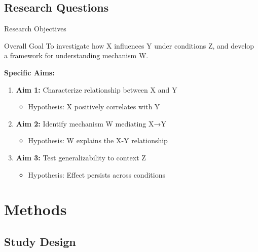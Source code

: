 \documentclass[aspectratio=169,11pt]{beamer}
\begin{document}
\subsection{Research Questions}

\begin{frame}{Research Objectives}
  \begin{exampleblock}{Overall Goal}
    To investigate how X influences Y under conditions Z, and develop a framework for understanding mechanism W.
  \end{exampleblock}

  \vspace{0.5cm}

  \textbf{Specific Aims:}
  \begin{enumerate}
    \item \textbf{Aim 1:} Characterize relationship between X and Y
    \begin{itemize}
      \item Hypothesis: X positively correlates with Y
    \end{itemize}

    \item \textbf{Aim 2:} Identify mechanism W mediating X→Y
    \begin{itemize}
      \item Hypothesis: W explains the X-Y relationship
    \end{itemize}

    \item \textbf{Aim 3:} Test generalizability to context Z
    \begin{itemize}
      \item Hypothesis: Effect persists across conditions
    \end{itemize}
  \end{enumerate}
\end{frame}


\section{Methods}

\subsection{Study Design}
\end{document}
